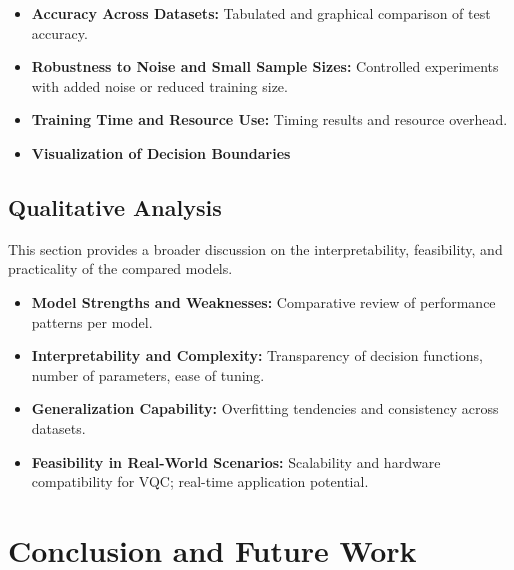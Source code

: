 \begin{itemize}
    \item \textbf{Accuracy Across Datasets:} Tabulated and graphical comparison of test accuracy.
    \item \textbf{Robustness to Noise and Small Sample Sizes:} Controlled experiments with added noise or reduced training size.
    \item \textbf{Training Time and Resource Use:} Timing results and resource overhead.
    \item \textbf{Visualization of Decision Boundaries}
\end{itemize}

\section{Qualitative Analysis}
\label{sec:qualitative}

This section provides a broader discussion on the interpretability, feasibility, and practicality of the compared models.

\begin{itemize}
    \item \textbf{Model Strengths and Weaknesses:} Comparative review of performance patterns per model.
    \item \textbf{Interpretability and Complexity:} Transparency of decision functions, number of parameters, ease of tuning.
    \item \textbf{Generalization Capability:} Overfitting tendencies and consistency across datasets.
    \item \textbf{Feasibility in Real-World Scenarios:} Scalability and hardware compatibility for VQC; real-time application potential.
\end{itemize}



\chapter{Conclusion and Future Work}

